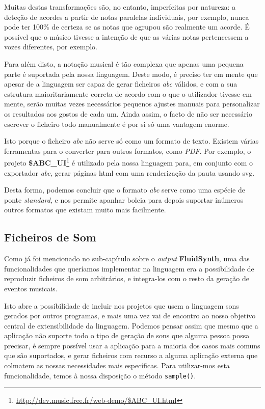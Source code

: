 Muitas destas transformações são, no entanto, imperfeitas por natureza: a deteção de acordes a partir de notas paralelas individuais, por exemplo, nunca pode ter 100\% de certeza se as notas que agrupou são realmente um acorde. É possível que o músico tivesse a intenção de que as várias notas pertencessem a vozes diferentes, por exemplo.

Para além disto, a notação musical é tão complexa que apenas uma pequena parte é suportada pela nossa linguagem. Deste modo, é preciso ter em mente que apesar de a linguagem ser capaz de gerar ficheiros \textit{abc} válidos, e com a sua estrutura maioritariamente correta de acordo com o que o utilizador tivesse em mente, serão muitas vezes necessários pequenos ajustes manuais para personalizar os resultados aos gostos de cada um. Ainda assim, o facto de não ser necessário escrever o ficheiro todo manualmente é por si só uma vantagem enorme.

Isto porque o ficheiro \textit{abc} não serve só como um formato de texto. Existem várias ferramentas para o converter para outros formatos, como \textit{PDF}. Por exemplo, o projeto \textbf{\$ABC\_UI}\footnote{\url{http://dev.music.free.fr/web-demo/\$ABC_UI.html}} é utilizado pela nossa linguagem para, em conjunto com o exportador \textit{abc}, gerar páginas \acrshort{html} com uma renderização da pauta usando \acrfull{svg}.

Desta forma, podemos concluir que o formato \textit{abc} serve como uma espécie de ponte \textit{standard}, e nos permite apanhar boleia para depois suportar inúmeros outros formatos que existam muito mais facilmente.


\subsection{Ficheiros de Som}
Como já foi mencionado no sub-capítulo sobre o \textit{output} \textbf{FluidSynth}, uma das funcionalidades que queríamos implementar na linguagem era a possibilidade de reproduzir ficheiros de som arbitrários, e integra-los com o resto da geração de eventos musicais.

Isto abre a possibilidade de incluir nos projetos que usem a linguagem sons gerados por outros programas, e mais uma vez vai de encontro ao nosso objetivo central de extensibilidade da linguagem. Podemos pensar assim que mesmo que a aplicação não suporte todo o tipo de geração de sons que alguma pessoa possa precisar, é sempre possível usar a aplicação para a maioria dos casos mais comuns que são suportados, e gerar ficheiros com recurso a alguma aplicação externa que colmatem as nossas necessidades mais específicas. Para utilizar-mos esta funcionalidade, temos à nossa disposição o método \texttt{sample()}.

